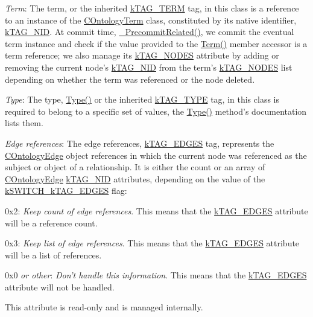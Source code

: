 {\itshape 
\begin{DoxyItemize}
\item {\itshape Term}\-: The term, or the inherited {\ttfamily \hyperlink{}{k\-T\-A\-G\-\_\-\-T\-E\-R\-M}} tag, in this class is a reference to an instance of the \hyperlink{class_c_ontology_term}{C\-Ontology\-Term} class, constituted by its native identifier, \hyperlink{}{k\-T\-A\-G\-\_\-\-N\-I\-D}. At commit time, \hyperlink{}{\-\_\-\-Precommit\-Related()}, we commit the eventual term instance and check if the value provided to the \hyperlink{}{Term()} member accessor is a term reference; we also manage its \hyperlink{}{k\-T\-A\-G\-\_\-\-N\-O\-D\-E\-S} attribute by adding or removing the current node's \hyperlink{}{k\-T\-A\-G\-\_\-\-N\-I\-D} from the term's \hyperlink{}{k\-T\-A\-G\-\_\-\-N\-O\-D\-E\-S} list depending on whether the term was referenced or the node deleted. 
\item {\itshape Type}\-: The type, {\ttfamily \hyperlink{}{Type()}} or the inherited {\ttfamily \hyperlink{}{k\-T\-A\-G\-\_\-\-T\-Y\-P\-E}} tag, in this class is required to belong to a specific set of values, the \hyperlink{}{Type()} method's documentation lists them. 
\item {\itshape Edge references}\-: The edge references, {\ttfamily \hyperlink{}{k\-T\-A\-G\-\_\-\-E\-D\-G\-E\-S}} tag, represents the \hyperlink{class_c_ontology_edge}{C\-Ontology\-Edge} object references in which the current node was referenced as the subject or object of a relationship. It is either the count or an array of \hyperlink{class_c_ontology_edge}{C\-Ontology\-Edge} \hyperlink{}{k\-T\-A\-G\-\_\-\-N\-I\-D} attributes, depending on the value of the \hyperlink{}{k\-S\-W\-I\-T\-C\-H\-\_\-k\-T\-A\-G\-\_\-\-E\-D\-G\-E\-S} flag\-: 
\begin{DoxyItemize}
\item {\ttfamily 0x2}\-: {\itshape Keep count of edge references}. This means that the \hyperlink{}{k\-T\-A\-G\-\_\-\-E\-D\-G\-E\-S} attribute will be a reference count. 
\item {\ttfamily 0x3}\-: {\itshape Keep list of edge references}. This means that the \hyperlink{}{k\-T\-A\-G\-\_\-\-E\-D\-G\-E\-S} attribute will be a list of references. 
\item {\ttfamily 0x0} {\itshape or other}\-: {\itshape Don't handle this information}. This means that the \hyperlink{}{k\-T\-A\-G\-\_\-\-E\-D\-G\-E\-S} attribute will not be handled. 
\end{DoxyItemize}This attribute is read-\/only and is managed internally. 
\end{DoxyItemize}}

